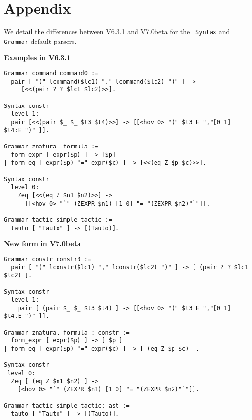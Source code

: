 \documentclass[11pt]{article}
\begin{document}
\section*{Appendix}
\label{Appendix}
We detail the differences between {\Coq} V6.3.1 and V7.0beta for the {\tt
Syntax} and {\tt Grammar} default parsers.

\medskip

{\bf Examples in V6.3.1}

\begin{verbatim}
Grammar command command0 :=
  pair [ "(" lcommand($lc1) "," lcommand($lc2) ")" ] ->
	 [<<(pair ? ? $lc1 $lc2)>>].

Syntax constr
  level 1:
  pair [<<(pair $_ $_ $t3 $t4)>>] -> [[<hov 0> "(" $t3:E ","[0 1] $t4:E ")" ]].

Grammar znatural formula :=
  form_expr [ expr($p) ] -> [$p]
| form_eq [ expr($p) "=" expr($c) ] -> [<<(eq Z $p $c)>>].

Syntax constr
  level 0:
    Zeq [<<(eq Z $n1 $n2)>>] -> 
      [[<hov 0> "`" (ZEXPR $n1) [1 0] "= "(ZEXPR $n2)"`"]].

Grammar tactic simple_tactic :=
  tauto [ "Tauto" ] -> [(Tauto)].
\end{verbatim}

\medskip

{\bf New form in V7.0beta}

\begin{verbatim}
Grammar constr constr0 :=
  pair [ "(" lconstr($lc1) "," lconstr($lc2) ")" ] -> [ (pair ? ? $lc1 $lc2) ].

Syntax constr
  level 1:
    pair [ (pair $_ $_ $t3 $t4) ] -> [[<hov 0> "(" $t3:E ","[0 1] $t4:E ")" ]].

Grammar znatural formula : constr :=
  form_expr [ expr($p) ] -> [ $p ]
| form_eq [ expr($p) "=" expr($c) ] -> [ (eq Z $p $c) ].

Syntax constr
 level 0:
  Zeq [ (eq Z $n1 $n2) ] -> 
    [<hov 0> "`" (ZEXPR $n1) [1 0] "= "(ZEXPR $n2)"`"]].

Grammar tactic simple_tactic: ast :=
  tauto [ "Tauto" ] -> [(Tauto)].
\end{verbatim}
\end{document}
